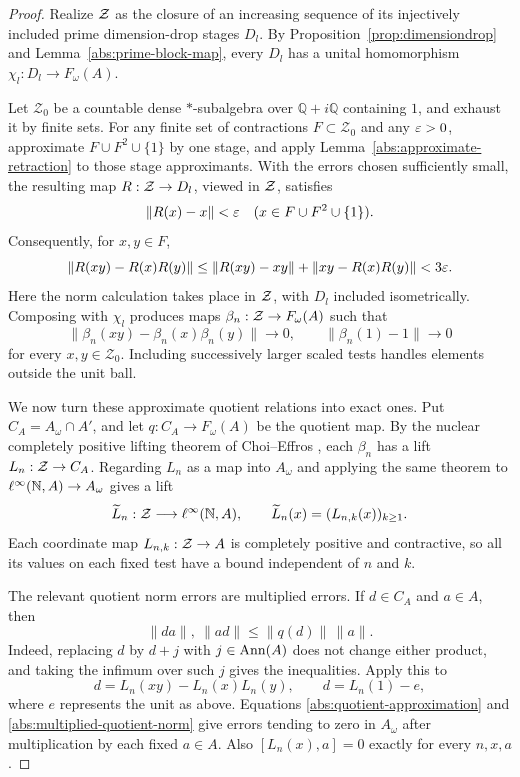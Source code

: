 \begin{proof}
Realize $\mathcal Z$ as the closure of an increasing sequence of its
injectively included prime dimension-drop stages $D_l$.
By Proposition~\ref{prop:dimensiondrop} and
Lemma~\ref{abs:prime-block-map}, every $D_l$ has a unital
homomorphism $\chi_l:D_l\to F_\omega(A)$.

Let $\mathcal Z_0$ be a countable dense $*$-subalgebra over
$\mathbb Q+i\mathbb Q$ containing $1$, and exhaust it by finite
sets.  For any finite set of contractions $F\subset\mathcal Z_0$
and any $\varepsilon>0$, approximate $F\cup F^2\cup\{1\}$ by one
stage, and apply Lemma~\ref{abs:approximate-retraction} to those
stage approximants.  With the errors chosen sufficiently small,
the resulting \cpc map $R:\mathcal Z\to D_l$, viewed in $\mathcal Z$, satisfies
\[
 \|R(x)-x\|<\varepsilon
 \quad(x\in F\cup F^2\cup\{1\}).
\]
Consequently, for $x,y\in F$,
\[
 \|R(xy)-R(x)R(y)\|
 \le\|R(xy)-xy\|+\|xy-R(x)R(y)\|<3\varepsilon.
\]
Here the norm calculation takes place in $\mathcal Z$, with $D_l$ included
isometrically.  Composing with $\chi_l$ produces \cpc maps
$\beta_n:\mathcal Z\to F_\omega(A)$ such that
\begin{equation}\label{abs:quotient-approximation}
 \|\beta_n(xy)-\beta_n(x)\beta_n(y)\|\longrightarrow0,
 \qquad \|\beta_n(1)-1\|\longrightarrow0
\end{equation}
for every $x,y\in\mathcal Z_0$.  Including successively larger
scaled tests handles elements outside the unit ball.

We now turn these approximate quotient relations into exact ones.
Put $C_A=A_\omega\cap A'$, and let $q:C_A\to F_\omega(A)$
be the quotient map.  By the nuclear completely positive lifting
theorem of Choi--Effros
\cite[Theorem~3.10 and Corollary~3.11]{CE1976}, each $\beta_n$ has a \cpc
lift $L_n:\mathcal Z\to C_A$.  Regarding $L_n$ as a map into $A_\omega$
and applying the same theorem to
$\ell^\infty(\mathbb N,A)\to A_\omega$ gives a \cpc lift
\[
 \widetilde L_n:\mathcal Z\longrightarrow\ell^\infty(\mathbb N,A),
 \qquad \widetilde L_n(x)=(L_{n,k}(x))_{k\ge1}.
\]
Each coordinate map $L_{n,k}:\mathcal Z\to A$ is completely positive
and contractive, so all its values on each fixed test have a bound
independent of $n$ and $k$.

The relevant quotient norm errors are multiplied errors.
If $d\in C_A$ and $a\in A$, then
\begin{equation}\label{abs:multiplied-quotient-norm}
 \|da\|,\ \|ad\|\le\|q(d)\|\,\|a\|.
\end{equation}
Indeed, replacing $d$ by $d+j$ with $j\in\operatorname{Ann}(A)$ does not
change either product, and taking the infimum over such $j$ gives
the inequalities.  Apply this to
\[
 d=L_n(xy)-L_n(x)L_n(y),\qquad d=L_n(1)-e,
\]
where $e$ represents the unit as above.  Equations
\eqref{abs:quotient-approximation} and
\eqref{abs:multiplied-quotient-norm} give errors tending to zero
in $A_\omega$ after multiplication by each fixed $a\in A$.
Also $[L_n(x),a]=0$ exactly for every $n,x,a$.


\end{proof}
